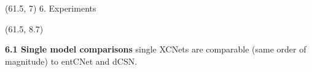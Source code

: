 \documentclass[final]{beamer}
\begin{document}
\begin{frame}{}

    


  \begin{textblock}{17.5}(61.5, 7)
    6. Experiments
  \end{textblock}
  \begin{textblock}{17.5}(61.5, 8.7)

    {\bf 6.1 Single model comparisons}
    \small single XCNets are comparable (same order of magnitude) to
    \textsf{entCNet} and \textsf{dCSN}.
\vspace{10pt}
    
    \begin{minipage}{0.7\linewidth}
      \centering
    

\end{minipage}
\end{textblock}
\end{frame}
\end{document}
